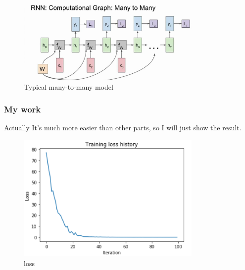 \documentclass{article}
\begin{document}
\begin{figure}[htbp]
	\centering  %
	\includegraphics[width=0.8\textwidth]{2.jpg} 
	\caption{Typical many-to-many model}  %
	\label{fig:f2}   %
\end{figure}

\subsubsection{My work}
Actually It's much more easier than other parts, so I will just show the result.

\begin{figure}[htbp]
	\centering  %
	\includegraphics[width=0.8\textwidth]{3.png} 
	\caption{loss}  %
	\label{fig:f3}   %
\end{figure}
\end{document}

